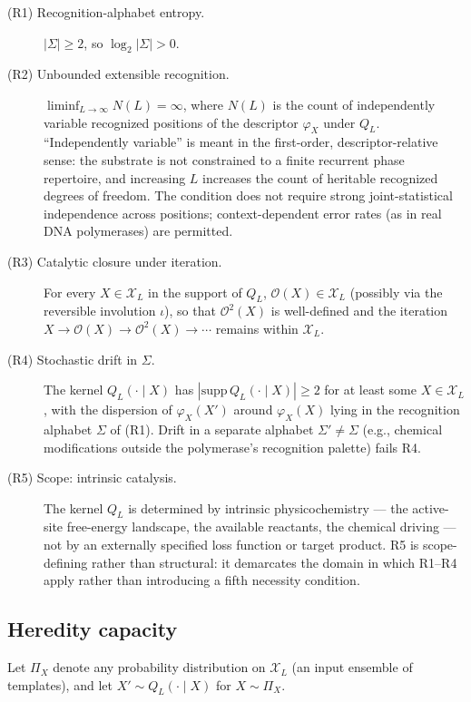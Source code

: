 \documentclass[11pt]{article}
\theoremstyle{plain}
\theoremstyle{definition}
\newcommand{\descX}{\varphi_X}
\newcommand{\Xset}{\mathcal{X}}
\newcommand{\Op}{\mathcal{O}}
\begin{document}
\begin{description}
\item[(R1) Recognition-alphabet entropy.] $|\Sigma| \ge 2$, so $\log_2 |\Sigma| > 0$.

\item[(R2) Unbounded extensible recognition.] $\liminf_{L \to \infty} N(L) = \infty$, where $N(L)$ is the count of independently variable recognized positions of the descriptor $\descX$ under $Q_L$. ``Independently variable'' is meant in the first-order, descriptor-relative sense: the substrate is not constrained to a finite recurrent phase repertoire, and increasing $L$ increases the count of heritable recognized degrees of freedom. The condition does not require strong joint-statistical independence across positions; context-dependent error rates (as in real DNA polymerases) are permitted.

\item[(R3) Catalytic closure under iteration.] For every $X \in \Xset_L$ in the support of $Q_L$, $\Op(X) \in \Xset_L$ (possibly via the reversible involution $\iota$), so that $\Op^2(X)$ is well-defined and the iteration $X \to \Op(X) \to \Op^2(X) \to \cdots$ remains within $\Xset_L$.

\item[(R4) Stochastic drift in $\Sigma$.] The kernel $Q_L(\cdot \mid X)$ has $|\mathrm{supp}\, Q_L(\cdot \mid X)| \ge 2$ for at least some $X \in \Xset_L$, with the dispersion of $\descX(X')$ around $\descX(X)$ lying in the recognition alphabet $\Sigma$ of (R1). Drift in a separate alphabet $\Sigma' \ne \Sigma$ (e.g., chemical modifications outside the polymerase's recognition palette) fails R4.

\item[(R5) Scope: intrinsic catalysis.] The kernel $Q_L$ is determined by intrinsic physicochemistry --- the active-site free-energy landscape, the available reactants, the chemical driving --- not by an externally specified loss function or target product. R5 is scope-defining rather than structural: it demarcates the domain in which R1--R4 apply rather than introducing a fifth necessity condition.
\end{description}

\subsection{Heredity capacity}
\label{subsec:capacity_def}

Let $\Pi_X$ denote any probability distribution on $\Xset_L$ (an input ensemble of templates), and let $X' \sim Q_L(\cdot \mid X)$ for $X \sim \Pi_X$.
\end{document}
